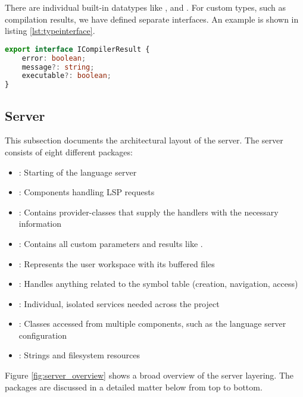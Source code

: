 There are individual built-in datatypes like ,  and  \cite{ts-types}.
For custom types, such as compilation results, we have defined separate interfaces.
An example is shown in listing \ref{lst:typeinterface}.

\begin{lstlisting}[language=typescript, caption={Type Interface Supplementing \code{any}-types}, captionpos=b, label={lst:typeinterface}]
export interface ICompilerResult {
    error: boolean;
    message?: string;
    executable?: boolean;
}
\end{lstlisting}




\subsection{Server}
This subsection documents the architectural layout of the server.
The server consists of eight different packages:
\begin{itemize}
    \item {}: Starting of the language server
    \item {}: Components handling LSP requests
    \item {}: Contains provider-classes that supply the handlers with the necessary information
    \item {}: Contains all custom parameters and results like .
    \item {}: Represents the user workspace with its buffered files
    \item {}: Handles anything related to the symbol table (creation, navigation, access)
    \item {}: Individual, isolated services needed across the project
    \item {}: Classes accessed from multiple components, such as the language server configuration
    \item {}: Strings and filesystem resources
\end{itemize}

Figure \ref{fig:server_overview} shows a broad overview of the server layering.
The packages are discussed in a detailed matter below from top to bottom.

